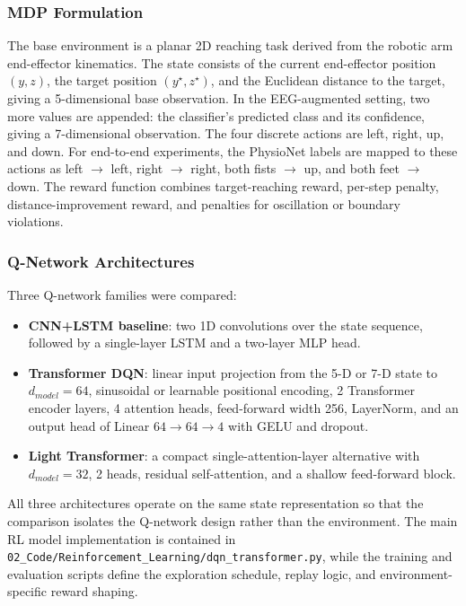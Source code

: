 \documentclass[12pt, a4paper]{article}
\begin{document}
\subsubsection{MDP Formulation}

The base environment is a planar 2D reaching task derived from the robotic arm end-effector kinematics. The state consists of the current end-effector position $(y, z)$, the target position $(y^\star, z^\star)$, and the Euclidean distance to the target, giving a 5-dimensional base observation. In the EEG-augmented setting, two more values are appended: the classifier's predicted class and its confidence, giving a 7-dimensional observation. The four discrete actions are left, right, up, and down. For end-to-end experiments, the PhysioNet labels are mapped to these actions as left $\rightarrow$ left, right $\rightarrow$ right, both fists $\rightarrow$ up, and both feet $\rightarrow$ down. The reward function combines target-reaching reward, per-step penalty, distance-improvement reward, and penalties for oscillation or boundary violations.

\subsubsection{Q-Network Architectures}

Three Q-network families were compared:
\begin{itemize}
    \item \textbf{CNN+LSTM baseline}: two 1D convolutions over the state sequence, followed by a single-layer LSTM and a two-layer MLP head.
    \item \textbf{Transformer DQN}: linear input projection from the 5-D or 7-D state to $d_{model}=64$, sinusoidal or learnable positional encoding, 2 Transformer encoder layers, 4 attention heads, feed-forward width 256, LayerNorm, and an output head of Linear $64 \rightarrow 64 \rightarrow 4$ with GELU and dropout.
    \item \textbf{Light Transformer}: a compact single-attention-layer alternative with $d_{model}=32$, 2 heads, residual self-attention, and a shallow feed-forward block.
\end{itemize}
All three architectures operate on the same state representation so that the comparison isolates the Q-network design rather than the environment. The main RL model implementation is contained in \texttt{02\_Code/Reinforcement\_Learning/dqn\_transformer.py}, while the training and evaluation scripts define the exploration schedule, replay logic, and environment-specific reward shaping.
\end{document}
